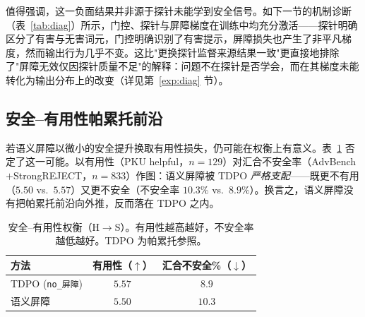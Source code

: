 \documentclass[lettersize,journal]{IEEEtran}
\begin{document}
值得强调，这一负面结果并非源于探针未能学到安全信号。如下一节的机制诊断（表~\ref{tab:diag}）所示，门控、探针与屏障梯度在训练中均充分激活——探针明确区分了有害与无害词元，门控明确识别了有害提示，屏障损失也产生了非平凡梯度，然而输出行为几乎不变。这比"更换探针监督来源结果一致"更直接地排除了"屏障无效仅因探针质量不足"的解释：问题不在探针是否学会，而在其梯度未能转化为输出分布上的改变（详见第~\ref{exp:diag} 节）。

\begin{table}[t]
\centering
\caption{语义屏障的行为消融（H$\to$S）。AdvBench/StrongREJECT 报告不安全率（越低越好），XSTest-safe 报告对安全提示的拒答率（越低越好）。无害性均值（$/10$）附于括号。所有方法间差异均不显著（见正文统计检验）。}
\label{tab:barrier-ablation}
\end{table}

\subsection{安全--有用性帕累托前沿}\label{exp:pareto}
若语义屏障以微小的安全提升换取有用性损失，仍可能在权衡上有意义。表~\ref{tab:pareto} 否定了这一可能。以有用性（PKU helpful，$n{=}129$）对汇合不安全率（AdvBench$+$StrongREJECT，$n{=}833$）作图：语义屏障被 TDPO \emph{严格支配}——既更不有用（$5.50$ vs.\ $5.57$）又更不安全（不安全率 $10.3\%$ vs.\ $8.9\%$）。换言之，语义屏障没有把帕累托前沿向外推，反而落在 TDPO 之内。

\begin{table}[t]
\centering
\caption{安全--有用性权衡（H$\to$S）。有用性越高越好，不安全率越低越好。TDPO 为帕累托参照。}
\label{tab:pareto}
\begin{tabular}{lcc}
\toprule
方法 & 有用性（$\uparrow$） & 汇合不安全\%（$\downarrow$） \\
\midrule
TDPO (\texttt{no\_屏障}) & $5.57$ & $8.9$ \\
语义屏障 & $5.50$ & $10.3$ \\
\bottomrule
\end{tabular}
\end{table}
\end{document}
